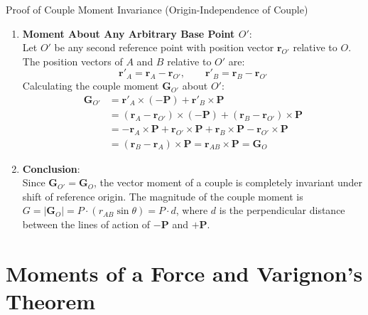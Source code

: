 \begin{proofbox}{Proof of Couple Moment Invariance (Origin-Independence of Couple)}
\begin{enumerate}[leftmargin=1.5em]
    \item \textbf{Moment About Any Arbitrary Base Point $O'$}:\\
    Let $O'$ be any second reference point with position vector $\mathbf{r}_{O'}$ relative to $O$.
    The position vectors of $A$ and $B$ relative to $O'$ are:
    \begin{equation*}
        \mathbf{r}'_A = \mathbf{r}_A - \mathbf{r}_{O'}, \qquad \mathbf{r}'_B = \mathbf{r}_B - \mathbf{r}_{O'}
    \end{equation*}
    Calculating the couple moment $\mathbf{G}_{O'}$ about $O'$:
    \begin{align}
        \mathbf{G}_{O'} &= \mathbf{r}'_A \times (-\mathbf{P}) + \mathbf{r}'_B \times \mathbf{P} \nonumber \\
        &= (\mathbf{r}_A - \mathbf{r}_{O'}) \times (-\mathbf{P}) + (\mathbf{r}_B - \mathbf{r}_{O'}) \times \mathbf{P} \nonumber \\
        &= -\mathbf{r}_A \times \mathbf{P} + \mathbf{r}_{O'} \times \mathbf{P} + \mathbf{r}_B \times \mathbf{P} - \mathbf{r}_{O'} \times \mathbf{P} \nonumber \\
        &= (\mathbf{r}_B - \mathbf{r}_A) \times \mathbf{P} = \mathbf{r}_{AB} \times \mathbf{P} = \mathbf{G}_O
    \end{align}

    \item \textbf{Conclusion}:\\
    Since $\mathbf{G}_{O'} = \mathbf{G}_O$, the vector moment of a couple is completely invariant under shift of reference origin.
    The magnitude of the couple moment is $G = |\mathbf{G}_O| = P \cdot (r_{AB}\sin\theta) = P \cdot d$, where $d$ is the perpendicular distance between the lines of action of $-\mathbf{P}$ and $+\mathbf{P}$.
\end{enumerate}
\end{proofbox}

\section{Moments of a Force and Varignon's Theorem}

